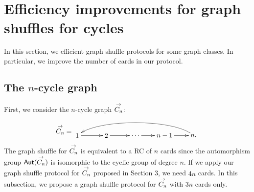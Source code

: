 \section{Efficiency improvements for graph shuffles for cycles}\label{s:app}

In this section, we  efficient graph shuffle protocols for some  graph classes. 
In particular, we improve the number of cards in our protocol.  

\subsection{The $n$-cycle graph} \label{4-1}
First, we consider the $n$-cycle graph $\overset{\rightarrow}{C_n}$:
\[ \overset{\ra}{C_n}= \begin{xy}
                     (0,-2)*[o]+{1}="1",(15,-2)*[o]+{2}="2",(30,-2)*[o]+{\cdots}="3",(45,-2)*[o]+{n-1}="4",(60,-2)*[o]+{n.}="n",
                     \ar "1";"2"^{}
                     \ar "2";"3"^{}
                     \ar "3";"4"_{}
                     \ar "4";"n"_{}
                     \ar @(lu,ur)"n";"1"_{}
            \end{xy}\]
The graph shuffle for  $\overset{\rightarrow}{C_n}$ is equivalent to a RC of $n$ cards since the automorphism group $\mathsf{Aut}(\overset{\rightarrow}{C_n})$ is isomorphic to the cyclic group of degree $n$.
If we apply our graph shuffle protocol for $\overset{\rightarrow}{C_n}$ proposed in Section 3, we need $4n$ cards.
In this subsection, we propose a graph shuffle protocol for $\overset{\rightarrow}{C_n}$ with $3n$ cards only. 


